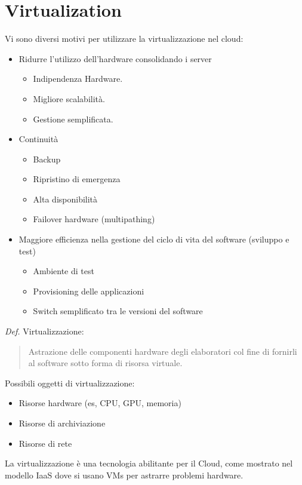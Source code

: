 \documentclass{article}
\begin{document}
		\section{Virtualization}
		Vi sono diversi motivi per utilizzare la virtualizzazione nel cloud:
		\begin{itemize}
		    \item Ridurre l'utilizzo dell'hardware consolidando i server
		    \begin{itemize}
		        \item Indipendenza Hardware.
		        \item Migliore scalabilità.
		        \item Gestione semplificata.
		    \end{itemize}
		    \item Continuità
		    \begin{itemize}
		        \item Backup
		        \item Ripristino di emergenza
		        \item Alta disponibilità
		        \item Failover hardware (multipathing)
		    \end{itemize}
		    \item Maggiore efficienza nella gestione del ciclo di vita del software (sviluppo e test)
		    \begin{itemize}
		        \item Ambiente di test
		        \item Provisioning delle applicazioni
		        \item Switch semplificato tra le versioni del software
		    \end{itemize}
		\end{itemize}
		
		\emph{Def.} Virtualizzazione: 
		\begin{quote}
			Astrazione delle componenti hardware degli elaboratori col fine di fornirli al software sotto forma di risorsa virtuale.
		\end{quote}
		Possibili oggetti di virtualizzazione:
		\begin{itemize}
		    \item Risorse hardware (es, CPU, GPU, memoria)
		    \item Risorse di archiviazione 
		    \item Risorse di rete
		\end{itemize}
		La virtualizzazione è una tecnologia abilitante per il Cloud, come mostrato nel modello IaaS dove si usano VMs per astrarre problemi hardware.\\
		
\end{document}
